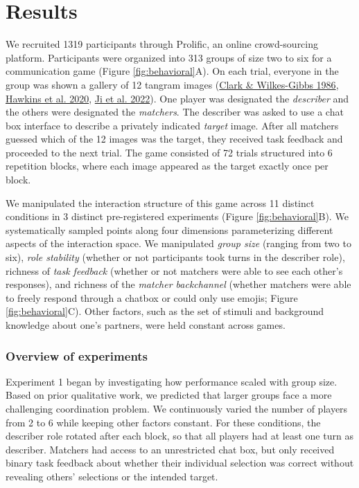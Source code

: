 \documentclass[
  english,
]{article}
\begin{document}
\hypertarget{results}{%
\section{Results}\label{results}}

We recruited 1319 participants through Prolific, an online crowd-sourcing platform.
Participants were organized into 313 groups of size two to six for a communication game (Figure \ref{fig:behavioral}A).
On each trial, everyone in the group was shown a gallery of 12 tangram images (\protect\hyperlink{ref-clark1986}{Clark \& Wilkes-Gibbs 1986}, \protect\hyperlink{ref-hawkins2020}{Hawkins et al. 2020}, \protect\hyperlink{ref-ji2022abstract}{Ji et al. 2022}).
One player was designated the \emph{describer} and the others were designated the \emph{matchers}.
The describer was asked to use a chat box interface to describe a privately indicated \emph{target} image.
After all matchers guessed which of the 12 images was the target, they received task feedback and proceeded to the next trial.
The game consisted of 72 trials structured into 6 repetition blocks, where each image appeared as the target exactly once per block.

We manipulated the interaction structure of this game across 11 distinct conditions in 3 distinct pre-registered experiments (Figure \ref{fig:behavioral}B).
We systematically sampled points along four dimensions parameterizing different aspects of the interaction space.
We manipulated \emph{group size} (ranging from two to six), \emph{role stability} (whether or not participants took turns in the describer role), richness of \emph{task feedback} (whether or not matchers were able to see each other's responses), and richness of the \emph{matcher backchannel} (whether matchers were able to freely respond through a chatbox or could only use emojis; Figure \ref{fig:behavioral}C).
Other factors, such as the set of stimuli and background knowledge about one's partners, were held constant across games.

\hypertarget{overview-of-experiments}{%
\subsubsection{Overview of experiments}\label{overview-of-experiments}}

Experiment 1 began by investigating how performance scaled with group size.
Based on prior qualitative work, we predicted that larger groups face a more challenging coordination problem.
We continuously varied the number of players from 2 to 6 while keeping other factors constant.
For these conditions, the describer role rotated after each block, so that all players had at least one turn as describer.
Matchers had access to an unrestricted chat box, but only received binary task feedback about whether their individual selection was correct without revealing others' selections or the intended target.
\end{document}
